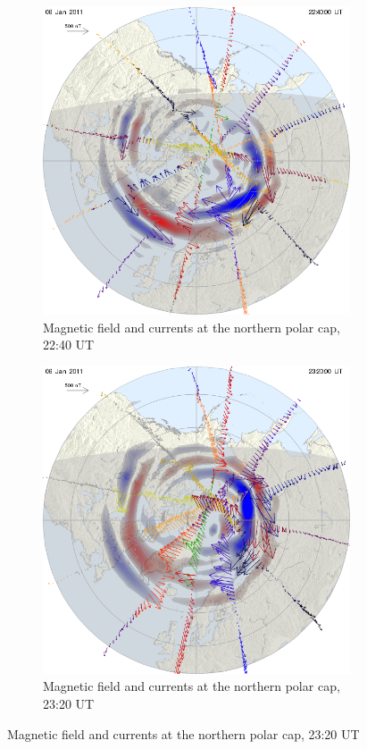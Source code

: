 \documentclass[10pt,a4paper]{article}
\begin{document}
\begin{figure}[h]
	\begin{subfigure}[h]{.5\textwidth}
		\centering
		\includegraphics[width=.8\linewidth]{1294353600north.png}
		\caption{Magnetic field and currents at the northern polar cap, 22:40 UT}
		\label{amp5}
	\end{subfigure}
	\begin{subfigure}[h]{.5\textwidth}
		\centering
		\includegraphics[width=.8\linewidth]{1294356000north.png}
		\caption{Magnetic field and currents at the northern polar cap, 23:20 UT}
		\label{amp6}
	\end{subfigure}

\end{figure}
\end{document}
